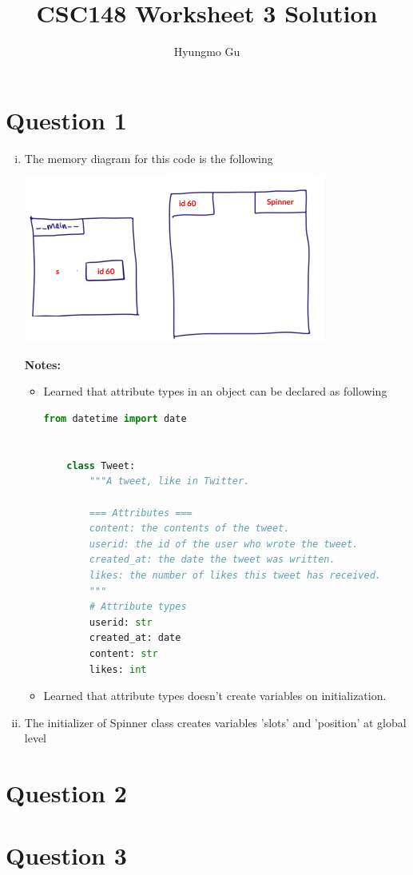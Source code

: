 \documentclass[12pt]{article}
\begin{document}
\title{CSC148 Worksheet 3 Solution}
\author{Hyungmo Gu}
\maketitle

\section*{Question 1}
\begin{enumerate}[i.]
    \item

    The memory diagram for this code is the following

    \begin{center}
    \includegraphics[width=0.7\linewidth]{images/worksheet_3_q1a_solution.png}
    \end{center}

    \bigskip

    \textbf{Notes:}

    \begin{itemize}
    \item Learned that attribute types in an object can be declared as following

    \begin{lstlisting}[language=Python]
    from datetime import date


    class Tweet:
        """A tweet, like in Twitter.

        === Attributes ===
        content: the contents of the tweet.
        userid: the id of the user who wrote the tweet.
        created_at: the date the tweet was written.
        likes: the number of likes this tweet has received.
        """
        # Attribute types
        userid: str
        created_at: date
        content: str
        likes: int
    \end{lstlisting}

    \item Learned that attribute types doesn't create variables on initialization.
    \end{itemize}

    \item
    The initializer of Spinner class creates variables 'slots' and 'position' at
    global level
\end{enumerate}

\section*{Question 2}

\section*{Question 3}
\end{document}

